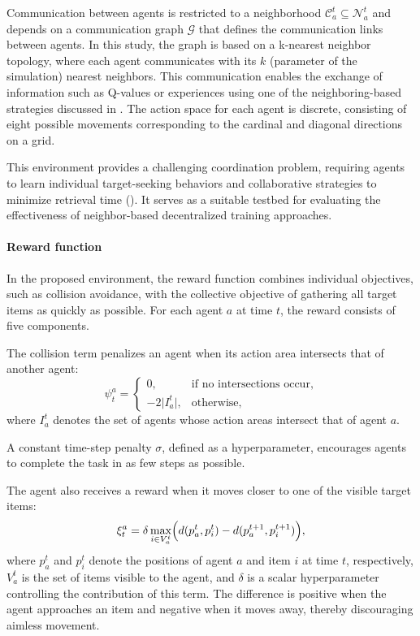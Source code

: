 Communication between agents is restricted to a neighborhood $\mathcal{C}_a^t \subseteq \mathcal{N}_a^t$ 
 and depends on a communication graph $\mathcal{G}$ that defines the communication links between agents. 
% 
In this study, 
 the graph is based on a k-nearest neighbor topology, 
 where each agent communicates with its $k$ (parameter of the simulation) nearest neighbors.
%
This communication enables the exchange of information such as Q-values or experiences 
 using one of the neighboring-based strategies discussed in .
%
The action space for each agent is discrete, 
 consisting of eight possible movements corresponding to the cardinal and diagonal directions on a grid.

This environment provides a challenging coordination problem, 
 requiring agents to learn individual target-seeking behaviors and collaborative strategies 
 to minimize retrieval time (). 
%
It serves as a suitable testbed for evaluating the effectiveness 
 of neighbor-based decentralized training approaches.

\paragraph{Reward function}

In the proposed environment,
the reward function combines individual objectives,
such as collision avoidance,
with the collective objective of gathering all target items
as quickly as possible.
%
For each agent $a$ at time $t$,
the reward consists of five components.

The collision term penalizes an agent when its action area
intersects that of another agent:
%
\begin{equation}
\psi_t^a =
\begin{cases}
    0, & \text{if no intersections occur}, \\
    -2 \lvert I_a^t \rvert, & \text{otherwise},
\end{cases}
\end{equation}
%
where $I_a^t$ denotes the set of agents whose action areas
intersect that of agent $a$.

A constant time-step penalty $\sigma$,
defined as a hyperparameter,
encourages agents to complete the task in as few steps as possible.

The agent also receives a reward when it moves closer
to one of the visible target items:
%
\begin{equation}
\xi_t^a =
\delta
\max_{i \in V_a^t}
\Bigl(
    d(p_a^t, p_i^t)
    -
    d(p_a^{t+1}, p_i^{t+1})
\Bigr),
\end{equation}
%
where $p_a^t$ and $p_i^t$ denote the positions of agent $a$
and item $i$ at time $t$, respectively,
$V_a^t$ is the set of items visible to the agent,
and $\delta$ is a scalar hyperparameter controlling
the contribution of this term.
%
The difference is positive when the agent approaches an item
and negative when it moves away,
thereby discouraging aimless movement.

